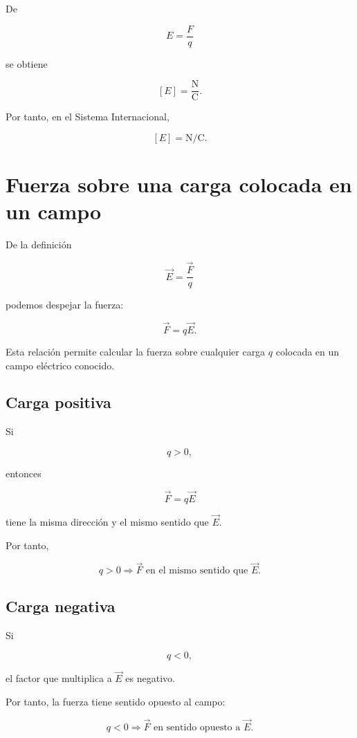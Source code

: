 De

\[
E=\frac{F}{q}
\]

se obtiene

\[
[E]=\frac{\si{\newton}}{\si{\coulomb}}.
\]

Por tanto, en el Sistema Internacional,

\begin{equation}
\boxed{[E]=\si{\newton\per\coulomb}}.
\end{equation}


\section{Fuerza sobre una carga colocada en un campo}

De la definición

\[
\vec E=\frac{\vec F}{q}
\]

podemos despejar la fuerza:

\begin{equation}
\boxed{\vec F=q\vec E}.
\label{eq:fuerza_campo_electrico}
\end{equation}

Esta relación permite calcular la fuerza sobre cualquier carga \(q\) colocada en un
campo eléctrico conocido.


\subsection{Carga positiva}

Si

\[
q>0,
\]

entonces

\[
\vec F=q\vec E
\]

tiene la misma dirección y el mismo sentido que \(\vec E\).

Por tanto,

\[
\boxed{q>0\Longrightarrow\vec F\text{ en el mismo sentido que }\vec E}.
\]


\subsection{Carga negativa}

Si

\[
q<0,
\]

el factor que multiplica a \(\vec E\) es negativo.

Por tanto, la fuerza tiene sentido opuesto al campo:

\[
\boxed{q<0\Longrightarrow\vec F\text{ en sentido opuesto a }\vec E}.
\]

